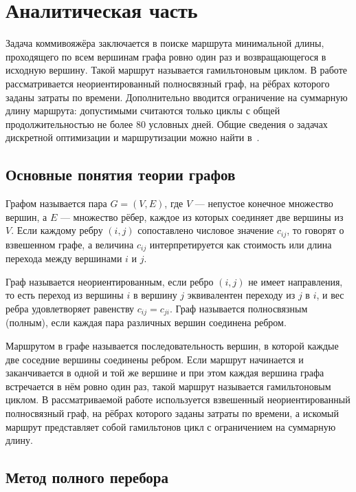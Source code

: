 \chapter{Аналитическая часть}

Задача коммивояжёра заключается в поиске маршрута минимальной длины, проходящего по всем вершинам графа ровно один раз и возвращающегося в исходную вершину. Такой маршрут называется гамильтоновым циклом. В работе рассматривается неориентированный полносвязный граф, на рёбрах которого заданы затраты по времени. Дополнительно вводится ограничение на суммарную длину маршрута: допустимыми считаются только циклы с общей продолжительностью не более 80 условных дней. Общие сведения о задачах дискретной оптимизации и маршрутизации можно найти в~\cite{malyshev}.

\section{Основные понятия теории графов}

Графом называется пара \(G = (V, E)\), где \(V\) --- непустое конечное множество вершин, а \(E\) --- множество рёбер, каждое из которых соединяет две вершины из \(V\). Если каждому ребру \((i, j)\) сопоставлено числовое значение \(c_{ij}\), то говорят о взвешенном графе, а величина \(c_{ij}\) интерпретируется как стоимость или длина перехода между вершинами \(i\) и \(j\).

Граф называется неориентированным, если ребро \((i, j)\) не имеет направления, то есть переход из вершины \(i\) в вершину \(j\) эквивалентен переходу из \(j\) в \(i\), и вес ребра удовлетворяет равенству \(c_{ij} = c_{ji}\). Граф называется полносвязным (полным), если каждая пара различных вершин соединена ребром.

Маршрутом в графе называется последовательность вершин, в которой каждые две соседние вершины соединены ребром. Если маршрут начинается и заканчивается в одной и той же вершине и при этом каждая вершина графа встречается в нём ровно один раз, такой маршрут называется гамильтоновым циклом. В рассматриваемой работе используется взвешенный неориентированный полносвязный граф, на рёбрах которого заданы затраты по времени, а искомый маршрут представляет собой гамильтонов цикл с ограничением на суммарную длину.


\section{Метод полного перебора}

